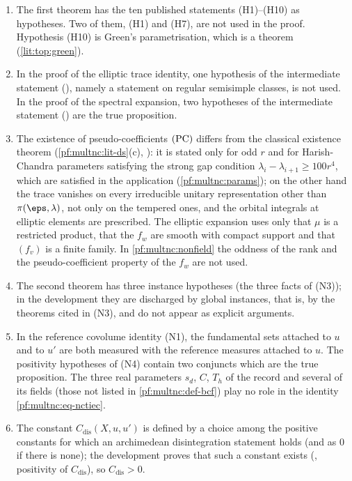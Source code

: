 \begin{remark}\label{pf:multnc:rem-formal}
\begin{enumerate}[label=(\alph*)]
\item The first theorem has the ten published statements (H1)--(H10) as hypotheses. Two of them, (H1) and (H7), are not
used in the proof. Hypothesis (H10) is Green's parametrisation, which is a theorem (\cref{lit:top:green}).
\item In the proof of the elliptic trace identity, one hypothesis of the intermediate statement
(), namely a statement on regular semisimple classes, is not used. In
the proof of the spectral expansion, two hypotheses of the intermediate statement
() are the true proposition.
\item The existence of pseudo-coefficients $\textup{(PC)}$ differs from the classical existence theorem
(\cref{pf:multnc:lit-ds}(c), \cite{ClozelDelorme1984}): it is stated only for odd $r$ and for Harish-Chandra parameters
satisfying the strong gap condition $\lambda_i-\lambda_{i+1}\ge100r^4$, which are satisfied in the application
(\cref{pf:multnc:params}); on the other hand the trace vanishes on every irreducible unitary representation other than
$\pi(\eps,\lambda)$, not only on the tempered ones, and the orbital integrals at elliptic elements are prescribed. The
elliptic expansion uses only that $\mu$ is a restricted product, that the $f_w$ are smooth with compact support and that
$(f_v)$ is a finite family. In \cref{pf:multnc:nonfield} the oddness of the rank and the pseudo-coefficient property of the
$f_w$ are not used.
\item The second theorem has three instance hypotheses (the three facts of (N3)); in the development they are discharged by
global instances, that is, by the theorems cited in (N3), and do not appear as explicit arguments.
\item In the reference covolume identity (N1), the fundamental sets attached to $u$ and to $u'$ are both measured with the
reference measures attached to $u$. The positivity hypotheses of (N4) contain two conjuncts which are the true proposition.
The three real parameters $s_d$, $C$, $T_h$ of the record and several of its fields (those not listed in
\cref{pf:multnc:def-bcf}) play no role in the identity \eqref{pf:multnc:eq-nctiec}.
\item The constant $C_{\mathrm{dis}}(X,u,u')$ is defined by a choice among the positive constants for which an archimedean
disintegration statement holds (and as $0$ if there is none); the development proves that such a constant exists
(, positivity of $C_{\mathrm{dis}}$), so $C_{\mathrm{dis}}>0$.
\end{enumerate}
\end{remark}

